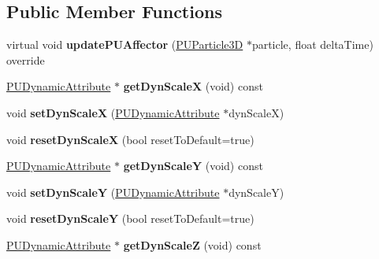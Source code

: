 \subsection*{Public Member Functions}
\begin{DoxyCompactItemize}
\item 
\mbox{\label{classPUScaleAffector_aabafdbcf236b9d2172dc914dbd15092b}} 
virtual void {\bfseries update\+P\+U\+Affector} (\hyperlink{structPUParticle3D}{P\+U\+Particle3D} $\ast$particle, float delta\+Time) override
\item 
\mbox{\label{classPUScaleAffector_a36f69c69a466909c7076736f07664062}} 
\hyperlink{classPUDynamicAttribute}{P\+U\+Dynamic\+Attribute} $\ast$ {\bfseries get\+Dyn\+ScaleX} (void) const
\item 
\mbox{\label{classPUScaleAffector_a50ec0603cc2abd9f68e8d61a8eb4ed63}} 
void {\bfseries set\+Dyn\+ScaleX} (\hyperlink{classPUDynamicAttribute}{P\+U\+Dynamic\+Attribute} $\ast$dyn\+ScaleX)
\item 
\mbox{\label{classPUScaleAffector_a2abb41b2f5672e3f1754de2c1d3e7899}} 
void {\bfseries reset\+Dyn\+ScaleX} (bool reset\+To\+Default=true)
\item 
\mbox{\label{classPUScaleAffector_a6e2936e17ecc697671fdc4f11070c5ba}} 
\hyperlink{classPUDynamicAttribute}{P\+U\+Dynamic\+Attribute} $\ast$ {\bfseries get\+Dyn\+ScaleY} (void) const
\item 
\mbox{\label{classPUScaleAffector_ae9dfc4db150fc14bee01cbc77f2a8499}} 
void {\bfseries set\+Dyn\+ScaleY} (\hyperlink{classPUDynamicAttribute}{P\+U\+Dynamic\+Attribute} $\ast$dyn\+ScaleY)
\item 
\mbox{\label{classPUScaleAffector_ab0d0e3bbc8465a8820644b2ed2e40357}} 
void {\bfseries reset\+Dyn\+ScaleY} (bool reset\+To\+Default=true)
\item 
\mbox{\label{classPUScaleAffector_a86ea805d84cde79cbfdcc7655792079c}} 
\hyperlink{classPUDynamicAttribute}{P\+U\+Dynamic\+Attribute} $\ast$ {\bfseries get\+Dyn\+ScaleZ} (void) const
\item 

\end{DoxyCompactItemize}
